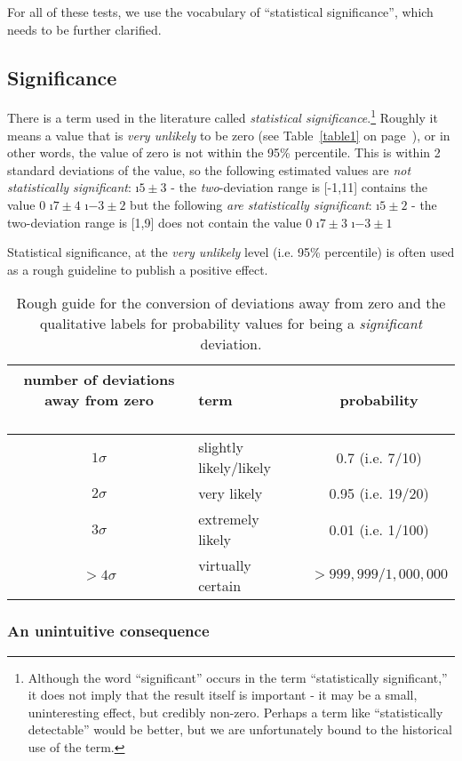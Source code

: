 For all of these tests, we use the vocabulary of ``statistical significance'', which needs to be further clarified.

\subsection{Significance}

There is a term used in the literature called {\em statistical significance}.\footnote{Although the word ``significant'' occurs in the term ``statistically significant,'' it does not imply that the result itself is important - it may be a small, uninteresting effect, but credibly non-zero.  Perhaps a term like ``statistically detectable'' would be better, but we are unfortunately bound to the historical use of the term.}  Roughly it means a value that is \emph{very unlikely} to be zero (see Table~\ref{table1} on page~\pageref{table1}), or in other words, the value of zero is not within the 95\% percentile.  This is within 2 standard deviations of the value, so the following estimated values are {\em not statistically significant}:
\bi
\i $5\pm 3$ - the \emph{two}-deviation range is [-1,11] contains the value 0
\i $7\pm 4$
\i $-3 \pm 2$
\ei
but the following {\em are statistically significant}:
\bi
\i $5\pm 2$  - the two-deviation range is [1,9] does not contain the value 0
\i $7\pm 3$
\i $-3 \pm 1$
\ei

Statistical significance, at the \emph{very unlikely} level (i.e. 95\% percentile) is often used as a rough guideline to publish a positive effect.  
\begin{table}
\begin{tabular}{cp{1.3in}c}
\parbox{1in}{number of deviations away from zero\\ \ }& term & probability \\\hline\hline
$1\sigma$ & slightly likely/likely & 0.7 (i.e. 7/10) \\
$2\sigma$ & very likely & 0.95 (i.e. 19/20) \\
$3\sigma$ & extremely likely & 0.01 (i.e. 1/100) \\
$>4\sigma$ & virtually certain & $>999,999/1,000,000$
\end{tabular}
\label{tbl:norm likely}
\caption{Rough guide for the conversion of deviations away from zero and the  qualitative labels for probability values for being a \emph{significant} deviation.}
\end{table}


\subsubsection{An unintuitive consequence}

